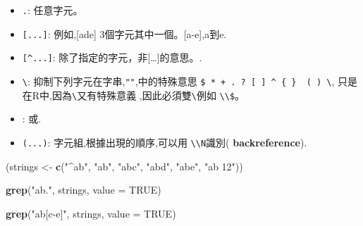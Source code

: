 \documentclass[]{book}
\newenvironment{Shaded}{\begin{snugshade}}{\end{snugshade}}
\newcommand{\DataTypeTok}[1]{\textcolor[rgb]{0.13,0.29,0.53}{#1}}
\newcommand{\KeywordTok}[1]{\textcolor[rgb]{0.13,0.29,0.53}{\textbf{#1}}}
\newcommand{\NormalTok}[1]{#1}
\newcommand{\OtherTok}[1]{\textcolor[rgb]{0.56,0.35,0.01}{#1}}
\newcommand{\StringTok}[1]{\textcolor[rgb]{0.31,0.60,0.02}{#1}}
\providecommand{\tightlist}{%
  \setlength{\itemsep}{0pt}\setlength{\parskip}{0pt}}
\theoremstyle{definition}
\theoremstyle{definition}
\theoremstyle{definition}
\theoremstyle{remark}
\begin{document}
\begin{itemize}
\tightlist
\item
  \texttt{.}: 任意字元。\\
\item
  \texttt{{[}...{]}}: 例如,{[}ade{]} 3個字元其中一個。{[}a-e{]},a到e.\\
\item
  \texttt{{[}\^{}...{]}}:
  除了\protect\hyperlink{section-1}{}指定的字元，非{[}\ldots{}{]}的意思。.\\
\item
  \texttt{\textbackslash{}}: 抑制下列字元在字串,\texttt{""},中的特殊意思
  \texttt{\$\ *\ +\ .\ ?\ {[}\ {]}\ \^{}\ \{\ \}\ \textbar{}\ (\ )\ \textbackslash{}},
  只是在R中,因為\texttt{\textbackslash{}}又有特殊意義
  ,因此必須雙\texttt{\textbackslash{}}例如
  \texttt{\textbackslash{}\textbackslash{}\$}。\\
\item
  \texttt{\textbar{}}: 或.\\
\item
  \texttt{(...)}: 字元組,根據出現的順序,可以用
  \texttt{\textbackslash{}\textbackslash{}N}識別(
  \textbf{backreference}).
\end{itemize}

\begin{Shaded}
\begin{Highlighting}[]
\NormalTok{(strings <-}\StringTok{ }\KeywordTok{c}\NormalTok{(}\StringTok{"^ab"}\NormalTok{, }\StringTok{"ab"}\NormalTok{, }\StringTok{"abc"}\NormalTok{, }\StringTok{"abd"}\NormalTok{, }\StringTok{"abe"}\NormalTok{, }\StringTok{"ab 12"}\NormalTok{))}
\end{Highlighting}
\end{Shaded}

\begin{Shaded}
\begin{Highlighting}[]
\KeywordTok{grep}\NormalTok{(}\StringTok{"ab."}\NormalTok{, strings, }\DataTypeTok{value =} \OtherTok{TRUE}\NormalTok{) }
\end{Highlighting}
\end{Shaded}

\begin{Shaded}
\begin{Highlighting}[]
\KeywordTok{grep}\NormalTok{(}\StringTok{"ab[c-e]"}\NormalTok{, strings, }\DataTypeTok{value =} \OtherTok{TRUE}\NormalTok{)}
\end{Highlighting}
\end{Shaded}
\end{document}
